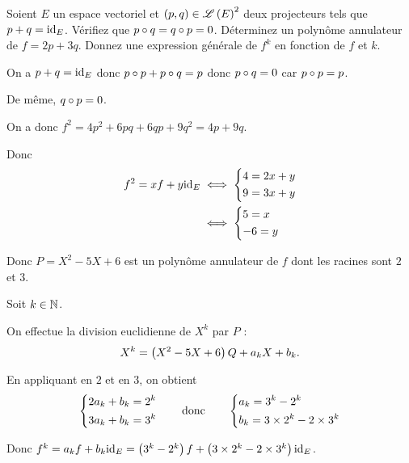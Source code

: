\begin{exo}
Soient \(E\) un espace vectoriel et \(\left(p,q\right)\in\mathscr{L}\left(E\right)^2\) deux projecteurs tels que \(p+q=\mathrm{id}_{E}\). Vérifiez que \(p\circ q=q\circ p=0\). Déterminez un polynôme annulateur de \(f=2p+3q\). Donnez une expression générale de \(f^k\) en fonction de \(f\) et \(k\).
\end{exo}

\begin{corr}
On a \(p+q=\mathrm{id}_{E}\) donc \(p\circ p+p\circ q=p\) donc \(p\circ q=0\) car \(p\circ p=p\).

De même, \(q\circ p=0\).

On a donc \(f^2=4p^2+6pq+6qp+9q^2=4p+9q\).

Donc \[\begin{aligned}
f^2=xf+y\mathrm{id}_{E}&\iff\begin{dcases}
4=2x+y \\
9=3x+y
\end{dcases} \\
&\iff\begin{dcases}
5=x \\
-6=y
\end{dcases}
\end{aligned}\]

Donc \(P=X^2-5X+6\) est un polynôme annulateur de \(f\) dont les racines sont \(2\) et \(3\).

Soit \(k\in\mathbb{N}\).

On effectue la division euclidienne de \(X^k\) par \(P\) : \[X^k=\left(X^2-5X+6\right)Q+a_kX+b_k.\]

En appliquant en \(2\) et en \(3\), on obtient \[\begin{dcases}
2a_k+b_k=2^k \\
3a_k+b_k=3^k
\end{dcases}\qquad\text{donc}\qquad\begin{dcases}
a_k=3^k-2^k \\
b_k=3\times2^k-2\times3^k
\end{dcases}\]

Donc \(f^k=a_kf+b_k\mathrm{id}_{E}=\left(3^k-2^k\right)f+\left(3\times2^k-2\times3^k\right)\mathrm{id}_{E}\).
\end{corr}

